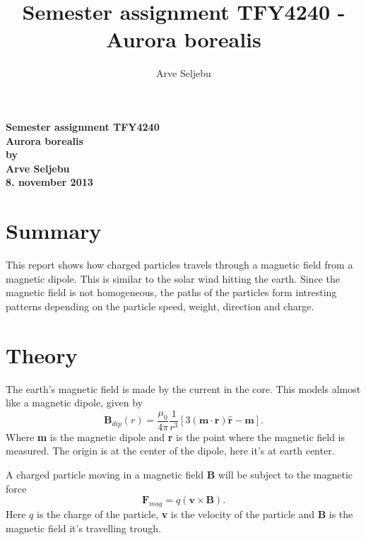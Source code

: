 \documentclass[11pt,a4paper]{article}
\begin{document}
\title{Semester assignment TFY4240 - Aurora borealis}
\author{Arve Seljebu}
\thispagestyle{empty}
\begin{center}
\vspace{5mm}
\LARGE
\textbf{Semester assignment TFY4240} \\
\vspace{5mm}
\textbf{Aurora borealis} \\
\Large
\vspace{15cm}
\textbf{by} \\
\vspace{5mm}
\large
\textbf{Arve Seljebu} \\
\vspace{5mm}
\textbf{8. november 2013} \\
\vspace{20mm}
\end{center}
\newpage
\tableofcontents
\thispagestyle{empty}
\setcounter{tocdepth}{2}
\newpage

\section{Summary}
This report shows how charged particles travels through a magnetic field from a magnetic dipole. This is similar to the solar wind hitting the earth. Since the magnetic field is not homogeneous, the paths of the particles form intresting patterns depending on the particle speed, weight, direction and charge.

\section{Theory}
The earth's magnetic field is made by the current in the core. This models almost like a magnetic dipole, given by
\begin{equation}
\label{equation.Bdip}
\textbf{B}_{dip}(r) = \frac{\mu_0}{4\pi} \frac{1}{r^3}[3(\textbf{m} \cdot \hat{\textbf{r} } ) \hat{\textbf{r}} -\textbf{m}].
\end{equation}
Where \textbf{m} is the magnetic dipole and \textbf{r} is the point where the magnetic field is measured. The origin is at the center of the dipole, here it's at earth center.

A charged particle moving in a magnetic field \textbf{B} will be subject to the magnetic force
\begin{equation}
\label{equation.forceMag}
\textbf{F}_{mag} = q(\textbf{v} \times \textbf{B}).
\end{equation}
Here $q$ is the charge of the particle, \textbf{v} is the velocity of the particle and \textbf{B} is the magnetic field it's travelling trough.
\end{document}
